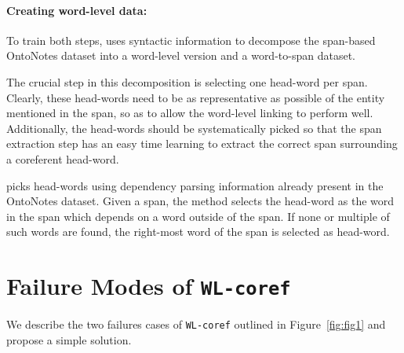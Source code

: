 \documentclass[11pt]{article}
\newcommand\wlcoref{{\texttt{WL-coref}}}
\begin{document}
\paragraph{Creating word-level data:} To train both steps, \citet{dobrovolskii-2021-word} uses syntactic information to decompose the span-based OntoNotes dataset into a word-level version and a word-to-span dataset. 

The crucial step in this decomposition is selecting one head-word per span. Clearly, these head-words need to be as representative as possible of the entity mentioned in the span, so as to allow the word-level linking to perform well. Additionally, the head-words should be systematically picked so that the span extraction step has an easy time learning to extract the correct span surrounding a coreferent head-word.

\citet{dobrovolskii-2021-word} picks head-words using dependency parsing information already present in the OntoNotes dataset. Given a span, the method selects the head-word as the word in the span which depends on a word outside of the span. If none or multiple of such words are found, the right-most word of the span is selected as head-word.


\section{Failure Modes of \wlcoref{}}
We describe the two failures cases of \wlcoref{} outlined in Figure~\ref{fig:fig1} and propose a simple solution.
\end{document}
